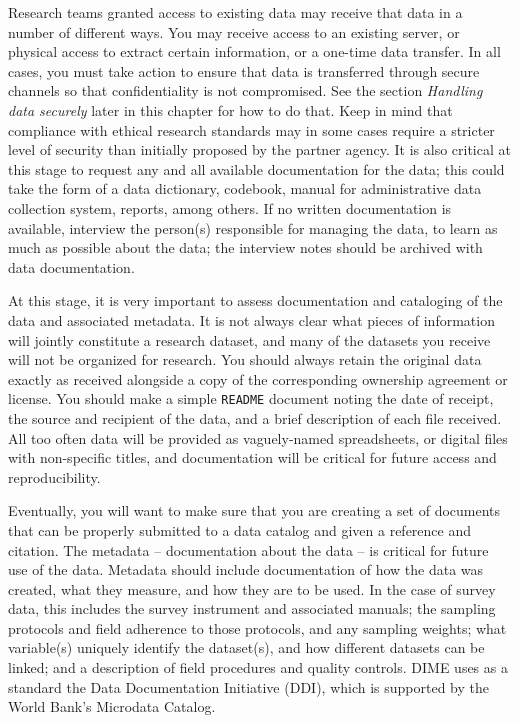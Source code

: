 Research teams granted access to existing data may receive that data in a number of different ways.
You may receive access to an existing server,
or physical access to extract certain information,
or a one-time data transfer.
In all cases, you must take action to ensure
that data is transferred through
secure channels so that confidentiality is not compromised.
See the section \textit{Handling data securely} later in this chapter for how to do that.
Keep in mind that compliance with ethical research standards may
in some cases require a stricter level of security than initially proposed by the partner agency.
It is also critical at this stage to request any and all available documentation for the data;
this could take the form of a data dictionary, codebook, 
manual for administrative data collection system, reports,
among others. 
If no written documentation is available, 
interview the person(s) responsible for managing the data,
to learn as much as possible about the data; 
the interview notes should be archived with data documentation.

At this stage, it is very important to assess
documentation and cataloging of the data and associated metadata.
It is not always clear what pieces of information will jointly constitute a research dataset,
and many of the datasets you receive will not be organized for research.
You should always retain the original data exactly as received
alongside a copy of the corresponding ownership agreement or license.
You should make a simple \texttt{README} document noting the date of receipt,
the source and recipient of the data,
and a brief description of each file received.
All too often data will be provided as vaguely-named spreadsheets,
or digital files with non-specific titles,
and documentation will be critical for future access and reproducibility.

Eventually, you will want to make sure that you are creating a set of documents
that can be properly submitted to a data catalog and given a reference and citation.
The metadata -- documentation about the data -- is critical for future use of the data.
Metadata should include documentation of how the data was created,
what they measure, and how they are to be used.
In the case of survey data, this includes the survey instrument and associated manuals;
the sampling protocols and field adherence to those protocols, and any sampling weights;
what variable(s) uniquely identify the dataset(s), and how different datasets can be linked;
and a description of field procedures and quality controls.
DIME uses as a standard the Data Documentation Initiative (DDI), which is supported by the
World Bank's Microdata Catalog.

